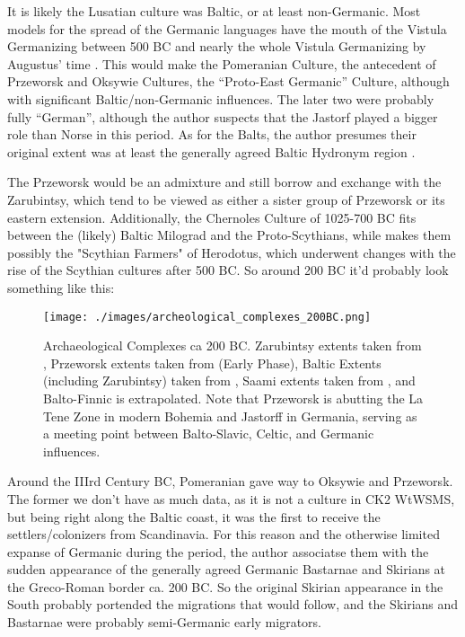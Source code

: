 \documentclass{article}
\begin{document}
	It is likely the Lusatian culture was Baltic, or at least non-Germanic.
	Most models for the spread of the Germanic languages have the mouth of the Vistula Germanizing between 500 BC and nearly the whole Vistula Germanizing by Augustus’ time \cite{HeatherEmpiresAndBarbarians}.
	This would make the Pomeranian Culture, the antecedent of Przeworsk and Oksywie Cultures, the “Proto-East Germanic” Culture, although with significant Baltic/non-Germanic influences.
	The later two were probably fully “German”, although the author suspects that the Jastorf played a bigger role than Norse in this period.
	As for the Balts, the author presumes their original extent was at least the generally agreed Baltic Hydronym region \cite{HeatherEmpiresAndBarbarians,BalticHydronyms}.
	
	The Przeworsk would be an admixture and still borrow and exchange with the Zarubintsy, which tend to be viewed as either a sister group of Przeworsk or its eastern extension.
	Additionally, the Chernoles Culture of 1025-700 BC fits between the (likely) Baltic Milograd and the Proto-Scythians, while makes them possibly the "Scythian Farmers" of Herodotus, which underwent changes with the rise of the Scythian cultures after 500 BC.
	So around 200 BC it’d probably look something like this:
	
	\begin{figure}[h!]
		\centering
		\texttt{[image: ./images/archeological\_complexes\_200BC.png]}
		\caption{Archaeological Complexes ca 200 BC.
			\tiny Zarubintsy extents taken from \cite{IndoEuroEncyclopedia}, Przeworsk extents taken from \cite{PrzeworskHistory} (Early Phase), Baltic Extents (including Zarubintsy) taken from \cite{BalticHydronyms}, Saami extents taken from \cite{LaplandSaami}, and Balto-Finnic is extrapolated.
			Note that Przeworsk is abutting the La Tene Zone in modern Bohemia and Jastorff in Germania, serving as a meeting point between Balto-Slavic, Celtic, and Germanic influences.}
	\end{figure}
	
	Around the IIIrd Century BC, Pomeranian gave way to Oksywie and Przeworsk.
	The former we don’t have as much data, as it is not a culture in CK2 WtWSMS, but being right along the Baltic coast, it was the first to receive the settlers/colonizers from Scandinavia.
	For this reason and the otherwise limited expanse of Germanic during the period, the author associatse them with the sudden appearance of the generally agreed Germanic Bastarnae and Skirians at the Greco-Roman border ca. 200 BC.
	So the original Skirian appearance in the South probably portended the migrations that would follow, and the Skirians and Bastarnae were probably semi-Germanic early migrators.
	
\end{document}
